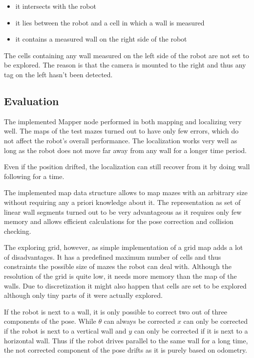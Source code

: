 \begin{itemize}
\item it intersects with the robot
\item it lies between the robot and a cell in which a wall is measured
\item it contains a measured wall on the right side of the robot
\end{itemize}

The cells containing any wall measured on the left side of the robot are not set to be explored. The reason is that the camera is mounted to the right and thus any tag on the left hasn't been detected.


\subsection{Evaluation}

The implemented Mapper node performed in both mapping and localizing very well. The maps of the test mazes turned out to have only few errors, which do not affect the robot’s overall performance. The localization works very well as long as the robot does not move far away from any wall for a longer time period. 

Even if the position drifted, the localization can still recover from it by doing wall following for a time.

The implemented map data structure allows to map mazes with an arbitrary size without requiring any a priori knowledge about it. The representation as set of linear wall segments turned out to be very advantageous as it requires only few memory and allows efficient calculations for the pose correction and collision checking. 

The exploring grid, however, as simple implementation of a grid map adds a lot of disadvantages. It has a predefined maximum number of cells and thus constraints the possible size of mazes the robot can deal with. Although the resolution of the grid is quite low, it needs more memory than the map of the walls. Due to discretization it might also happen that cells are set to be explored although only tiny parts of it were actually explored.

If the robot is next to a wall, it is only possible to correct two out of three components of the pose. While $\theta$ can always be corrected $x$ can only be corrected if the robot is next to a vertical wall and $y$ can only be corrected if it is next to a horizontal wall. Thus if the robot drives parallel to the same wall for a long time, the not corrected component of the pose drifts as it is purely based on odometry.

